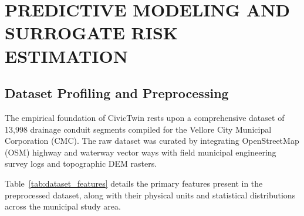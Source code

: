 \chapter{PREDICTIVE MODELING AND SURROGATE RISK ESTIMATION}

\section{Dataset Profiling and Preprocessing}
The empirical foundation of CivicTwin rests upon a comprehensive dataset of 13,998 drainage conduit segments compiled for the Vellore City Municipal Corporation (CMC). The raw dataset was curated by integrating OpenStreetMap (OSM) highway and waterway vector ways with field municipal engineering survey logs and topographic DEM rasters.

Table~\ref{tab:dataset_features} details the primary features present in the preprocessed dataset, along with their physical units and statistical distributions across the municipal study area.

